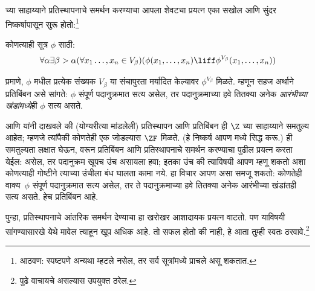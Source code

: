 \documentclass[../../../include/open-logic-section]{subfiles}
\begin{document}

\stagesinex{} च्या साहाय्याने प्रतिस्थापनाचे समर्थन करण्याचा आपला शेवटचा प्रयत्न एका सखोल आणि सुंदर निष्कर्षापासून सुरू होतो:\footnote{आठवण: स्पष्टपणे अन्यथा म्हटले नसेल, तर सर्व सूत्रांमध्ये प्राचले असू शकतात.}
\begin{thm}[प्रतिबिंबन रूपबंध]
कोणत्याही सूत्र $\phi$ साठी:
\[
\forall \alpha \exists \beta > \alpha (\forall x_1 \ldots, x_n \in
V_\beta)(\phi(x_1, \ldots, x_n) \liff \phi^{V_\beta}(x_1, \ldots, x_n))
\]
\end{thm}
\noindent
{} प्रमाणे, $\phi$ मधील प्रत्येक संख्यक $V_\beta$ या संचापुरता मर्यादित केल्यावर $\phi^{V_\beta}$ मिळते. म्हणून सहज अर्थाने प्रतिबिंबन असे सांगते: $\phi$ संपूर्ण पदानुक्रमात सत्य असेल, तर पदानुक्रमाच्या हवे तितक्या अनेक \emph{आरंभीच्या खंडांमध्ये}ही $\phi$ सत्य असते.

\citet{Montague1961} आणि \citet{Levy1960} यांनी दाखवले की (योग्यरीत्या मांडलेली) प्रतिस्थापन आणि प्रतिबिंबन ही $\Z$ च्या साहाय्याने समतुल्य आहेत; म्हणजे त्यांपैकी कोणतेही एक जोडल्यास $\ZF$ मिळते. (हे निष्कर्ष आपण  मध्ये सिद्ध करू.) ही समतुल्यता लक्षात घेऊन, \stagesinex{} वरून प्रतिबिंबन आणि प्रतिस्थापनाचे समर्थन करण्याचा पुढील प्रयत्न करता येईल: \stagesinex{} असेल, तर पदानुक्रम खूपच उंच असायला हवा; इतका उंच की त्याविषयी आपण म्हणू शकतो अशा कोणत्याही गोष्टीने त्याच्या उंचीला बंध घालता कामा नये. हा विचार आपण असा समजू शकतो: कोणतेही वाक्य~$\phi$ संपूर्ण पदानुक्रमात सत्य असेल, तर ते पदानुक्रमाच्या हवे तितक्या अनेक आरंभीच्या खंडांतही सत्य असते. हेच प्रतिबिंबन आहे.

पुन्हा, प्रतिस्थापनाचे आंतरिक समर्थन देण्याचा हा खरोखर आशादायक प्रयत्न वाटतो. पण याविषयी सांगण्यासारखे येथे मावेल त्याहून खूप अधिक आहे. तो सफल होतो की नाही, हे आता तुम्ही स्वतः ठरवावे.\footnote{पुढे वाचायचे असल्यास \citet[95--100]{Incurvati2020} उपयुक्त ठरेल.}
\end{document}

